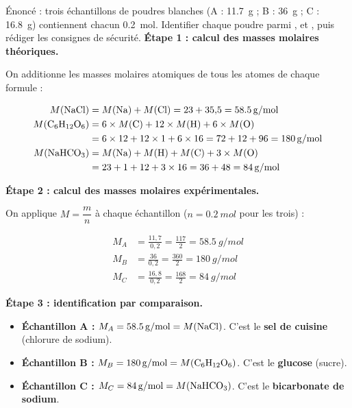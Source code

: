 \documentclass[11pt]{article}
\begin{document}
\begin{exoresolu}
Énoncé : trois échantillons de poudres blanches (A : \SI{11,7}{g} ; B : \SI{36}{g} ; C : \SI{16,8}{g}) contiennent chacun \SI{0,2}{mol}. Identifier chaque poudre parmi ,  et , puis rédiger les consignes de sécurité.
\tcblower
\textbf{Étape 1 : calcul des masses molaires théoriques.}

On additionne les masses molaires atomiques de tous les atomes de chaque formule :

\begin{align*}
M(\ce{NaCl}) &= M(\ce{Na}) + M(\ce{Cl}) = 23 + 35{,}5 = \SI{58,5}{g/mol} \\
M(\ce{C6H12O6}) &= 6 \times M(\ce{C}) + 12 \times M(\ce{H}) + 6 \times M(\ce{O}) \\
&= 6 \times 12 + 12 \times 1 + 6 \times 16 = 72 + 12 + 96 = \SI{180}{g/mol} \\
M(\ce{NaHCO3}) &= M(\ce{Na}) + M(\ce{H}) + M(\ce{C}) + 3 \times M(\ce{O}) \\
&= 23 + 1 + 12 + 3 \times 16 = 36 + 48 = \SI{84}{g/mol}
\end{align*}

\textbf{Étape 2 : calcul des masses molaires expérimentales.}

On applique $M = \dfrac{m}{n}$ à chaque échantillon ($n = \SI{0,2}{mol}$ pour les trois) :

\begin{align*}
M_A &= \frac{11{,}7}{0{,}2} = \frac{117}{2} = \SI{58,5}{g/mol} \\
M_B &= \frac{36}{0{,}2} = \frac{360}{2} = \SI{180}{g/mol} \\
M_C &= \frac{16{,}8}{0{,}2} = \frac{168}{2} = \SI{84}{g/mol}
\end{align*}

\textbf{Étape 3 : identification par comparaison.}

\begin{itemize}
\item \textbf{Échantillon A :} $M_A = \SI{58,5}{g/mol} = M(\ce{NaCl})$. C'est le \textbf{sel de cuisine} (chlorure de sodium).
\item \textbf{Échantillon B :} $M_B = \SI{180}{g/mol} = M(\ce{C6H12O6})$. C'est le \textbf{glucose} (sucre).
\item \textbf{Échantillon C :} $M_C = \SI{84}{g/mol} = M(\ce{NaHCO3})$. C'est le \textbf{bicarbonate de sodium}.
\end{itemize}


\end{exoresolu}
\end{document}
